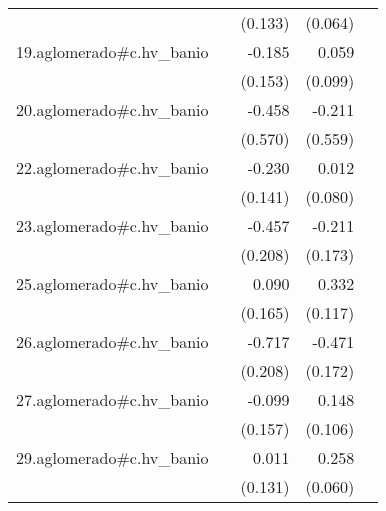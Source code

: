 {\begin{longtable}{l*{4}{D{.}{.}{-1}}}
            &                     &     (0.133)         &     (0.064)         &                     \\
\addlinespace
19.aglomerado#c.hv\_banio&                     &      -0.185         &       0.059         &                     \\
            &                     &     (0.153)         &     (0.099)         &                     \\
\addlinespace
20.aglomerado#c.hv\_banio&                     &      -0.458         &      -0.211         &                     \\
            &                     &     (0.570)         &     (0.559)         &                     \\
\addlinespace
22.aglomerado#c.hv\_banio&                     &      -0.230         &       0.012         &                     \\
            &                     &     (0.141)         &     (0.080)         &                     \\
\addlinespace
23.aglomerado#c.hv\_banio&                     &      -0.457\sym{*}  &      -0.211         &                     \\
            &                     &     (0.208)         &     (0.173)         &                     \\
\addlinespace
25.aglomerado#c.hv\_banio&                     &       0.090         &       0.332\sym{**} &                     \\
            &                     &     (0.165)         &     (0.117)         &                     \\
\addlinespace
26.aglomerado#c.hv\_banio&                     &      -0.717\sym{***}&      -0.471\sym{**} &                     \\
            &                     &     (0.208)         &     (0.172)         &                     \\
\addlinespace
27.aglomerado#c.hv\_banio&                     &      -0.099         &       0.148         &                     \\
            &                     &     (0.157)         &     (0.106)         &                     \\
\addlinespace
29.aglomerado#c.hv\_banio&                     &       0.011         &       0.258\sym{***}&                     \\
            &                     &     (0.131)         &     (0.060)         &                     \\

\end{longtable}}
